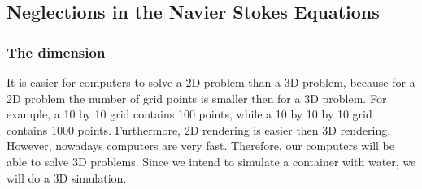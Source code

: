 \documentclass{article}
\begin{document}
\subsection{Neglections in the Navier Stokes Equations}
\subsubsection{The dimension}
It is easier for computers to solve a 2D problem than a 3D problem, because for a 2D problem the number of grid points is smaller then for a 3D problem. For example, a 10 by 10 grid contains 100 points, while a 10 by 10 by 10 grid contains 1000 points. Furthermore, 2D rendering is easier then 3D rendering. However, nowadays computers are very fast. Therefore, our computers will be able to solve 3D problems. Since we intend to simulate a container with water, we will do a 3D simulation.
\end{document}

